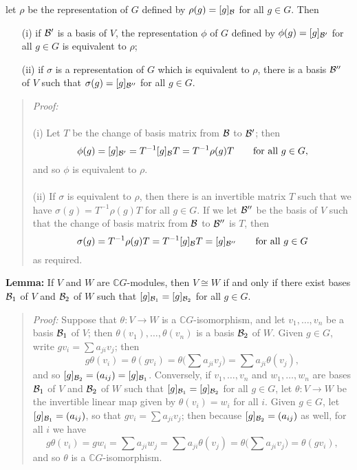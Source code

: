 let $\rho$ be the representation of $G$ defined by $\rho(g)=[g]_{\cal B}$ for all
$g\in G$. Then
\begin{itemize}
\item[(i)] if ${\cal B}'$ is a basis of $V$, the representation $\phi$ of
$G$ defined by $\phi(g)=[g]_{{\cal B}'}$ for all $g\in G$ is equivalent to $\rho$;
\item[(ii)] if $\sigma$ is a representation of $G$ which is equivalent to
$\rho$, there is a basis ${\cal B}''$ of $V$ such that $\sigma(g)=[g]_{{\cal B}''}$ for all
$g\in G$.
\end{itemize}
\begin{quote}
\emph{Proof:}
\\
\\
(i) Let $T$ be the change of basis matrix from ${\cal B}$ to ${\cal B}'$; then
$$\phi(g)=[g]_{{\cal B}'}=T^{-1}[g]_{\cal B} T=T^{-1}\rho(g)T\qquad\hbox{for all }g\in G,$$
and so $\phi$ is equivalent to $\rho$.
\\
\\
(ii) If $\sigma$ is equivalent to $\rho$, then there is an
invertible matrix $T$ such that we have $\sigma(g)=T^{-1}\rho(g)T$ for all
$g\in G$. If we let ${\cal B}''$ be the basis of $V$ such that the change of basis
matrix from ${\cal B}$ to ${\cal B}''$ is $T$, then
$$\sigma(g)=T^{-1}\rho(g)T=T^{-1}[g]_{\cal B} T=[g]_{{\cal B}''}
\qquad\hbox{for all }g\in G$$
as required.
\end{quote}
{\bf Lemma:} If $V$ and $W$ are ${\mathbb C}G$-modules, then
$V\cong W$ if and only if there exist bases ${\cal B}_1$ of $V$ and ${\cal B}_2$ of
$W$ such that $[g]_{{\cal B}_1}=[g]_{{\cal B}_2}$ for all $g\in G$.
\begin{quote}
\emph{Proof:}
Suppose that $\theta: V\rightarrow W$ is a ${\mathbb C}G$-isomorphism, and let
$v_1,\dots,v_n$ be a basis ${\cal B}_1$ of $V$; then
$\theta(v_1),\dots,\theta(v_n)$ is a basis ${\cal B}_2$ of $W$. Given
$g\in G$, write $gv_i=\sum a_{ji}v_j$; then
$$g\theta(v_i)=\theta(gv_i)=\theta\biggl(\sum a_{ji}v_j\biggr)
=\sum a_{ji}\theta(v_j),$$
and so $[g]_{{\cal B}_2}=(a_{ij})=[g]_{{\cal B}_1}$. Conversely, if $v_1,\dots,v_n$ and
$w_1,\dots,w_n$ are bases ${\cal B}_1$ of $V$ and ${\cal B}_2$ of $W$ such that
$[g]_{{\cal B}_1}=[g]_{{\cal B}_2}$ for all $g\in G$, let $\theta:V\rightarrow W$ be the
invertible linear map given by $\theta(v_i)=w_i$ for all $i$. Given
$g\in G$, let $[g]_{{\cal B}_1}=(a_{ij})$, so that $gv_i=\sum a_{ji}v_j$; then
because $[g]_{{\cal B}_2}=(a_{ij})$ as well, for all $i$  we have
$$g\theta(v_i)=gw_i=\sum a_{ji}w_j=\sum a_{ji}\theta(v_j)
=\theta\biggl(\sum a_{ji}v_j\biggr)=\theta(gv_i),$$
and so $\theta$ is a ${\mathbb C}G$-isomorphism.
\end{quote}
